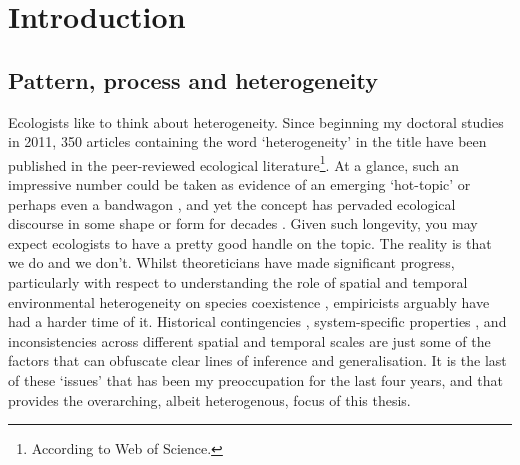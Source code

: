 
\graphicspath{{Chapter1/Figs}}


\chapter{Introduction}  %

\section{Pattern, process and heterogeneity} 

Ecologists like to think about heterogeneity. Since beginning my doctoral studies in 2011, 350 articles containing the word `heterogeneity' in the title have been published in the peer-reviewed ecological literature\footnote{According to Web of Science.}. At a glance, such an impressive number could be taken as evidence of an emerging `hot-topic' or perhaps even a bandwagon \citep{bandwagons}, and yet the concept has pervaded ecological discourse in some shape or form for decades \citep[e.g.][]{hutchinson1961, wiens1977, connell1978, kotler1988, li1995}. Given such longevity, you may expect ecologists to have a pretty good handle on the topic. The reality is that we do and we don't. Whilst theoreticians have made significant progress, particularly with respect to understanding the role of spatial and temporal environmental heterogeneity on species coexistence \citep{Shmida1984, Chesson1985, Chesson2000, Chesson1997, Amarasekare2003}, empiricists arguably have had a harder time of it. Historical contingencies \citep{belyea1999, Chase2003a, Fukami2005}, system-specific properties \citep{lawton1999}, and inconsistencies across different spatial and temporal scales \citep{levin1992, Swenson2006} are just some of the factors that can obfuscate clear lines of inference and generalisation. It is the last of these `issues' that has been my preoccupation for the last four years, and that provides the overarching, albeit heterogenous, focus of this thesis.

